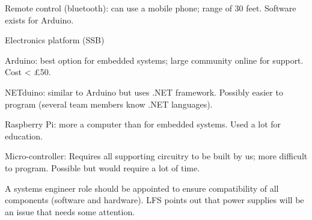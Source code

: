 \documentclass[a4paper,11pt,twoside,class=meetingmins,crop=false]{standalone}
\begin{document}
\begin{items}
\begin{subitems}
        \item Remote control (bluetooth): can use a mobile phone; range of 30 feet. Software exists for Arduino.
    \end{subitems}
    \item Electronics platform (SSB)
    \begin{subitems}
        \item Arduino: best option for embedded systems; large community online for support. Cost < \pounds{50}.
        \item NETduino: similar to Arduino but uses .NET framework. Possibly easier to program (several team members know .NET languages).
        \item Raspberry Pi: more a computer than for embedded systems. Used a lot for education.
        \item Micro-controller: Requires all supporting circuitry to be built by us; more difficult to program. Possible but would require a lot of time.
        \item A systems engineer role should be appointed to ensure compatibility of all components (software and hardware). LFS points out that power supplies will be an issue that needs some attention.
    \end{subitems}
\end{items}
\end{document}
